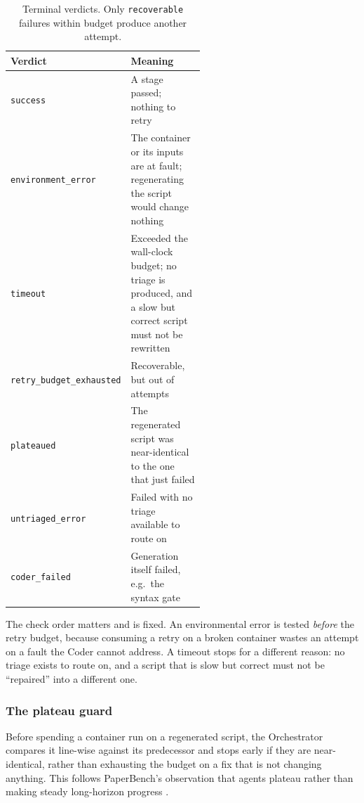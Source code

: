 \documentclass[10pt,twocolumn]{article}
\begin{document}
\begin{table}[htbp]
\centering
\small
\caption{Terminal verdicts. Only \texttt{recoverable} failures within budget produce
another attempt.}
\label{tab:verdicts}
\begin{tabular}{lp{0.55\linewidth}}
\toprule
Verdict & Meaning \\
\midrule
\texttt{success}                & A stage passed; nothing to retry \\
\texttt{environment\_error}     & The container or its inputs are at fault; regenerating
                                  the script would change nothing \\
\texttt{timeout}                & Exceeded the wall-clock budget; no triage is produced,
                                  and a slow but correct script must not be rewritten \\
\texttt{retry\_budget\_exhausted} & Recoverable, but out of attempts \\
\texttt{plateaued}              & The regenerated script was near-identical to the one
                                  that just failed \\
\texttt{untriaged\_error}       & Failed with no triage available to route on \\
\texttt{coder\_failed}          & Generation itself failed, e.g.\ the syntax gate \\
\bottomrule
\end{tabular}
\end{table}

The check order matters and is fixed. An environmental error is tested \emph{before} the
retry budget, because consuming a retry on a broken container wastes an attempt on a fault
the Coder cannot address. A timeout stops for a different reason: no triage exists to
route on, and a script that is slow but correct must not be ``repaired'' into a different
one.

\subsubsection{The plateau guard}

Before spending a container run on a regenerated script, the Orchestrator compares it
line-wise against its predecessor and stops early if they are near-identical, rather than
exhausting the budget on a fix that is not changing anything. This follows PaperBench's
observation that agents plateau rather than making steady long-horizon progress
\cite{starace2025paperbench}.
\end{document}
